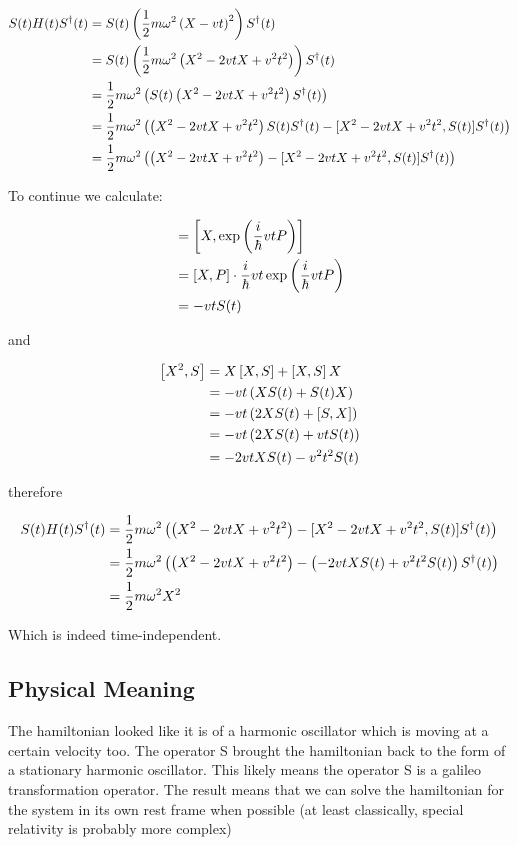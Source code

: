 \begin{align}
	S(t)H(t)S^\dagger(t) &= S(t)\left(\frac{1}{2}m\omega^2\left(X-vt\right)^2\right)S^\dagger(t)\\
	&= S(t)\left(\frac{1}{2}m\omega^2\left(X^2-2vtX+v^2t^2\right)\right)S^\dagger(t)\\
	&= \frac{1}{2}m\omega^2\left(S(t)\left(X^2-2vtX+v^2t^2\right)S^\dagger(t)\right)\\
	&= \frac{1}{2}m\omega^2 \left(\left(X^2-2vtX+v^2t^2\right)S(t)S^\dagger(t)-[X^2-2vtX+v^2t^2,S(t)]S^\dagger(t)\right)\\
	&= \frac{1}{2}m\omega^2 \left(\left(X^2-2vtX+v^2t^2\right)-[X^2-2vtX+v^2t^2,S(t)]S^\dagger(t)\right)
\end{align}

To continue we calculate:

\begin{align}
	[X,S] &= \left[X,\exp\left(\frac{i}{\hbar}vtP\right)\right]\\
	&= \comm{X,P}\cdot\frac{i}{\hbar}vt\exp\left(\frac{i}{\hbar}vtP\right)\\
	&= -vtS(t)
\end{align}

and

\begin{align}
	\left[X^2,S\right] &= X\left[X,S\right]+\left[X,S\right]X\\
	&= -vt\left(XS(t)+S(t)X\right)\\
	&= -vt\left(2XS(t)+\left[S,X\right]\right)\\
	&= -vt\left(2XS(t)+vtS(t)\right)\\
	&= -2vtXS(t)-v^2t^2S(t)
\end{align}

therefore

\begin{align}
	S(t)H(t)S^\dagger(t) &= \frac{1}{2}m\omega^2 \left(\left(X^2-2vtX+v^2t^2\right)-[X^2-2vtX+v^2t^2,S(t)]S^\dagger(t)\right)\\
	&= \frac{1}{2}m\omega^2 \left(\left(X^2-2vtX+v^2t^2\right)-\left(-2vtXS(t)+v^2t^2S(t)\right)S^\dagger(t)\right)\\
	&= \frac{1}{2}m\omega^2 X^2
\end{align}

Which is indeed time-independent.

\subsection{Physical Meaning}

The hamiltonian looked like it is of a harmonic oscillator which is moving at a certain velocity too. The operator S brought the hamiltonian back to the form of a stationary harmonic oscillator. This likely means the operator S is a galileo transformation operator. The result means that we can solve the hamiltonian for the system in its own rest frame when possible (at least classically, special relativity is probably more complex)